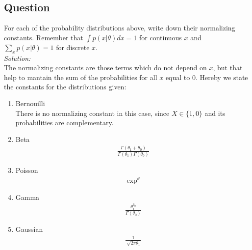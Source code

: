 \documentclass[12pt,a4paper]{article}
\begin{document}
\subsection{Question}
For each of the probability distributions above, write down their normalizing constants.  Remember that $\int p(x|\theta) d x = 1$ for continuous $x$ and $\sum_x p(x| \theta) = 1$ for discrete $x$.  \\
	\emph{Solution:} \\
		The normalizing constants are those terms which do not depend on $x$, but that help to mantain the sum of the probabilities for all $x$ equal to $0$. Hereby we state the constants for the distributions given: \\
		
		\begin{enumerate}
			\item{Bernouilli} \\
			There is no normalizing constant in this case, since $X \in \{1,0\}$ and its probabilities are complementary.
			
			\item{Beta}
			\begin{align*}
			\frac{\Gamma (\theta_1 + \theta_0)}{\Gamma (\theta_1) \Gamma (\theta_0)}
			\end{align*}
			
			\item{Poisson}
			\begin{align*}
			\exp^{\theta}
			\end{align*}
			
			\item{Gamma}
			\begin{align*}
			\frac{\theta_{1}^{\theta_{0}}}{\Gamma (\theta_{0})}
			\end{align*}
			
			\item{Gaussian}
			\begin{align*}
			\frac{1}{\sqrt[]{2\pi \theta_{1}}}
			\end{align*}
			
		\end{enumerate}
\end{document}
